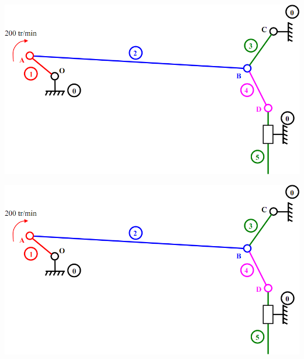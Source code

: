 \documentclass[11pt,oneside]{article}
\begin{document}
\begin{center}
\includegraphics[width=.6\textwidth]{png/fig2}
\end{center}


\begin{center}
\includegraphics[width=.6\textwidth]{png/fig2}
\end{center}
\end{document}
